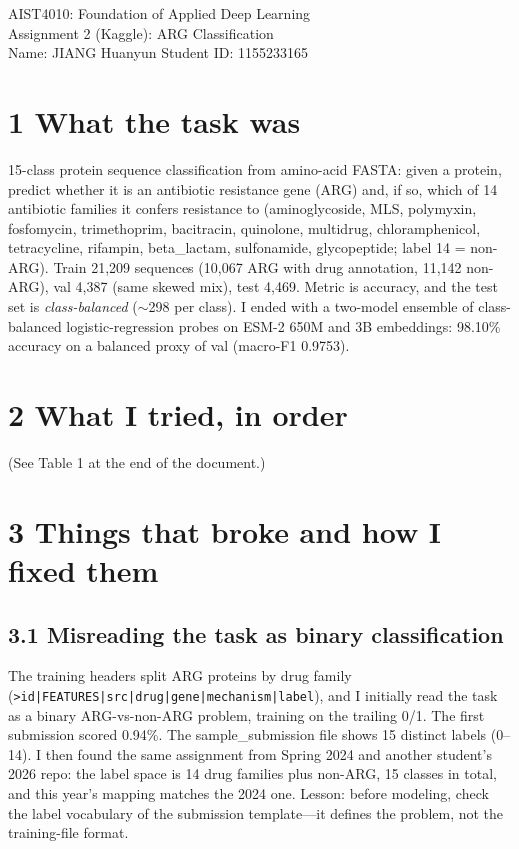 \documentclass[11pt,a4paper]{article}
\begin{document}
\begin{center}
{\large AIST4010: Foundation of Applied Deep Learning}\\[3pt]
{\large Assignment 2 (Kaggle): ARG Classification}\\[10pt]
Name: JIANG Huanyun \qquad Student ID: 1155233165
\end{center}

\section*{1 What the task was}

15-class protein sequence classification from amino-acid FASTA: given a
protein, predict whether it is an antibiotic resistance gene (ARG) and,
if so, which of 14 antibiotic families it confers resistance to
(aminoglycoside, MLS, polymyxin, fosfomycin, trimethoprim, bacitracin,
quinolone, multidrug, chloramphenicol, tetracycline, rifampin,
beta\_lactam, sulfonamide, glycopeptide; label 14 = non-ARG). Train
21{,}209 sequences (10{,}067 ARG with drug annotation, 11{,}142
non-ARG), val 4{,}387 (same skewed mix), test 4{,}469. Metric is
accuracy, and the test set is \emph{class-balanced} ($\sim$298 per
class). I ended with a two-model ensemble of class-balanced
logistic-regression probes on ESM-2 650M and 3B embeddings: 98.10\%
accuracy on a balanced proxy of val (macro-F1 0.9753).

\section*{2 What I tried, in order}

(See Table 1 at the end of the document.)

\section*{3 Things that broke and how I fixed them}

\subsection*{3.1 Misreading the task as binary classification}

The training headers split ARG proteins by drug family
(\texttt{>id|FEATURES|src|drug|gene|mechanism|label}), and I initially
read the task as a binary ARG-vs-non-ARG problem, training on the
trailing 0/1. The first submission scored 0.94\%. The
sample\_submission file shows 15 distinct labels (0--14). I then found
the same assignment from Spring 2024 and another student's 2026 repo:
the label space is 14 drug families plus non-ARG, 15 classes in total,
and this year's mapping matches the 2024 one. Lesson: before modeling,
check the label vocabulary of the submission template---it defines the
problem, not the training-file format.
\end{document}
